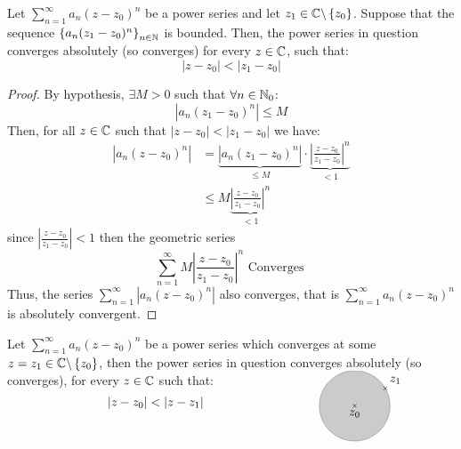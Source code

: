 \begin{proposition}
  Let $\sum_{n=1}^{\infty} a_n (z-z_0) ^n  $ be a power
  series and let $z_1 \in  \mathbb{C} \backslash 
  \left\{ z_0 \right\}$. Suppose that the sequence
  $\left\{ a_{n}(z_1-z_0) ^n  \right\}_{n \in \mathbb{N}}$ is 
  bounded. Then, the power series in question converges
  absolutely (so converges) for every $z \in \mathbb{C}$, such that: 
  \[
  \left| z-z_0 \right| <  \left| z_1-z_0 \right|
  \]
\end{proposition}
\begin{proof}
  By hypothesis, $\exists M > 0 $ such that $\forall n \in  \mathbb{N}_0$: 
  \[
  \left| a_n (z_1-z_0) ^n  \right| \leq M
  \]
  Then, for all $z \in \mathbb{C}  $ such that $\left| z-z_0 \right| < \left| z_1-z_0 \right|$ we have:
  \begin{align*}
    \left| a_n (z-z_0) ^n  \right| &= 
    \underbrace{
    \left| a_n (z_1-z_0) ^n  \right|
    }_{ \leq  M} 
    \cdot 
    \underbrace{
    \left| \frac{z - z_0}{z_1-z_0} \right|^n 
    }_{< 1} 
    \\
    & \leq  M 
    \underbrace{
    \left| \frac{z-z_0}{z_1-z_0} \right|^n 
    }_{ < 1} 
  \end{align*}
  since $\left| \frac{z-z_0}{z_1-z_0} \right| <  1$ then the geometric series 
  \[
  \sum_{n=1}^{\infty} M \left| \frac{z-z_0}{z_1-z_0} \right|^n  \text{ Converges } 
  \]
  Thus, the series $\sum_{n=1}^{\infty} \left| a_n (z-z_0) ^n  \right| $ also converges,
  that is $\sum_{n=1}^{\infty} a_n (z-z_0) ^n  $ is absolutely convergent.
\end{proof}

\begin{corollary}[]
Let $\sum_{n=1}^{\infty} a_n (z-z_0) ^n  $ be a power series which converges
at some  $z = z_1 \in \mathbb{C}  \backslash \left\{ z_0 \right\} $, then the power series
in question converges absolutely (so converges), for every $z \in \mathbb{C}  $ such that: 
\[
\left| z-z_0 \right| <  \left| z-z_1 \right| 
\quad  \quad  \quad 
\quad \quad \quad 
\quad \quad \quad 
\quad \quad \quad 
\begin{tikzpicture}[overlay]
  \draw[fill=gray, opacity=0.4] (0, 0) circle (1cm);
  \node[anchor=north] at (0,0) { $z_0 $ };
  \node[] at (0,0) {\tiny $\times   $  };
  \node[anchor=south west] at (30:1) { $z_1 $ };
  \node[] at (30:1) {\tiny $\times   $ };
\end{tikzpicture}
\]
\begin{center}
\end{center}
\end{corollary}

